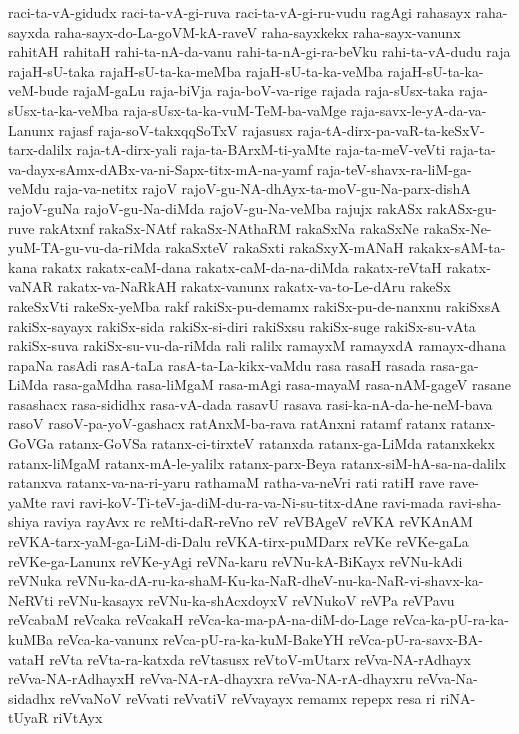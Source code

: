 {raci-ta-vA-gidudx
raci-ta-vA-gi-ruva
raci-ta-vA-gi-ru-vudu
ragAgi
rahasayx
raha-sayxda
raha-sayx-do-La-goVM-kA-raveV
raha-sayxkekx
raha-sayx-vanunx
rahitAH
rahitaH
rahi-ta-nA-da-vanu
rahi-ta-nA-gi-ra-beVku
rahi-ta-vA-dudu
raja
rajaH-sU-taka
rajaH-sU-ta-ka-meMba
rajaH-sU-ta-ka-veMba
rajaH-sU-ta-ka-veM-bude
rajaM-gaLu
raja-biVja
raja-boV-va-rige
rajada
raja-sUsx-taka
raja-sUsx-ta-ka-veMba
raja-sUsx-ta-ka-vuM-TeM-ba-vaMge
raja-savx-le-yA-da-va-Lanunx
rajasf
raja-soV-takxqqSoTxV
rajasusx
raja-tA-dirx-pa-vaR-ta-keSxV-tarx-dalilx
raja-tA-dirx-yali
raja-ta-BArxM-ti-yaMte
raja-ta-meV-veVti
raja-ta-va-dayx-sAmx-dABx-va-ni-Sapx-titx-mA-na-yamf
raja-teV-shavx-ra-liM-ga-veMdu
raja-va-netitx
rajoV
rajoV-gu-NA-dhAyx-ta-moV-gu-Na-parx-dishA
rajoV-guNa
rajoV-gu-Na-diMda
rajoV-gu-Na-veMba
rajujx
rakASx
rakASx-gu-ruve
rakAtxnf
rakaSx-NAtf
rakaSx-NAthaRM
rakaSxNa
rakaSxNe
rakaSx-Ne-yuM-TA-gu-vu-da-riMda
rakaSxteV
rakaSxti
rakaSxyX-mANaH
rakakx-sAM-ta-kana
rakatx
rakatx-caM-dana
rakatx-caM-da-na-diMda
rakatx-reVtaH
rakatx-vaNAR
rakatx-va-NaRkAH
rakatx-vanunx
rakatx-va-to-Le-dAru
rakeSx
rakeSxVti
rakeSx-yeMba
rakf
rakiSx-pu-demamx
rakiSx-pu-de-nanxnu
rakiSxsA
rakiSx-sayayx
rakiSx-sida
rakiSx-si-diri
rakiSxsu
rakiSx-suge
rakiSx-su-vAta
rakiSx-suva
rakiSx-su-vu-da-riMda
rali
ralilx
ramayxM
ramayxdA
ramayx-dhana
rapaNa
rasAdi
rasA-taLa
rasA-ta-La-kikx-vaMdu
rasa
rasaH
rasada
rasa-ga-LiMda
rasa-gaMdha
rasa-liMgaM
rasa-mAgi
rasa-mayaM
rasa-nAM-gageV
rasane
rasashacx
rasa-sididhx
rasa-vA-dada
rasavU
rasava
rasi-ka-nA-da-he-neM-bava
rasoV
rasoV-pa-yoV-gashacx
ratAnxM-ba-rava
ratAnxni
ratamf
ratanx
ratanx-GoVGa
ratanx-GoVSa
ratanx-ci-tirxteV
ratanxda
ratanx-ga-LiMda
ratanxkekx
ratanx-liMgaM
ratanx-mA-le-yalilx
ratanx-parx-Beya
ratanx-siM-hA-sa-na-dalilx
ratanxva
ratanx-va-na-ri-yaru
rathamaM
ratha-va-neVri
rati
ratiH
rave
rave-yaMte
ravi
ravi-koV-Ti-teV-ja-diM-du-ra-va-Ni-su-titx-dAne
ravi-mada
ravi-sha-shiya
raviya
rayAvx
rc
reMti-daR-reVno
reV
reVBAgeV
reVKA
reVKAnAM
reVKA-tarx-yaM-ga-LiM-di-Dalu
reVKA-tirx-puMDarx
reVKe
reVKe-gaLa
reVKe-ga-Lanunx
reVKe-yAgi
reVNa-karu
reVNu-kA-BiKayx
reVNu-kAdi
reVNuka
reVNu-ka-dA-ru-ka-shaM-Ku-ka-NaR-dheV-nu-ka-NaR-vi-shavx-ka-NeRVti
reVNu-kasayx
reVNu-ka-shAcxdoyxV
reVNukoV
reVPa
reVPavu
reVcabaM
reVcaka
reVcakaH
reVca-ka-ma-pA-na-diM-do-Lage
reVca-ka-pU-ra-ka-kuMBa
reVca-ka-vanunx
reVca-pU-ra-ka-kuM-BakeYH
reVca-pU-ra-savx-BA-vataH
reVta
reVta-ra-katxda
reVtasusx
reVtoV-mUtarx
reVva-NA-rAdhayx
reVva-NA-rAdhayxH
reVva-NA-rA-dhayxra
reVva-NA-rA-dhayxru
reVva-Na-sidadhx
reVvaNoV
reVvati
reVvatiV
reVvayayx
remamx
repepx
resa
ri
riNA-tUyaR
riVtAyx
}
